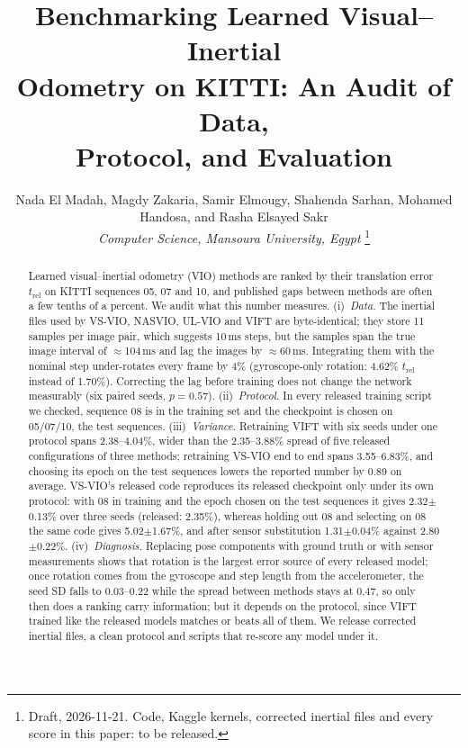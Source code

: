 \documentclass[letterpaper,journal]{IEEEtran}
\newcommand{\trel}{t_{\mathrm{rel}}}
\begin{document}
\title{Benchmarking Learned Visual--Inertial\\Odometry on KITTI: An Audit of Data,\\Protocol, and Evaluation}

\author{Nada El Madah, Magdy Zakaria, Samir Elmougy, Shahenda Sarhan, Mohamed Handosa, and Rasha Elsayed Sakr\\
\textit{Computer Science, Mansoura University, Egypt}%
\thanks{Draft, 2026-11-21. Code, Kaggle kernels, corrected inertial files and every score in this paper: to be released.}}


\maketitle

\begin{abstract}
Learned visual--inertial odometry (VIO) methods are ranked by their translation error $\trel$ on KITTI sequences 05, 07 and 10, and published gaps between methods are often a few tenths of a percent. We audit what this number measures. (i)~\emph{Data.} The inertial files used by VS-VIO, NASVIO, UL-VIO and VIFT are byte-identical; they store 11 samples per image pair, which suggests 10\,ms steps, but the samples span the true image interval of $\approx$104\,ms and lag the images by $\approx$60\,ms. Integrating them with the nominal step under-rotates every frame by 4\% (gyroscope-only rotation: 4.62\% $\trel$ instead of 1.70\%). Correcting the lag before training does not change the network measurably (six paired seeds, $p=0.57$). (ii)~\emph{Protocol.} In every released training script we checked, sequence 08 is in the training set and the checkpoint is chosen on 05/07/10, the test sequences. (iii)~\emph{Variance.} Retraining VIFT with six seeds under one protocol spans 2.38--4.04\%, wider than the 2.35--3.88\% spread of five released configurations of three methods; retraining VS-VIO end to end spans 3.55--6.83\%, and choosing its epoch on the test sequences lowers the reported number by 0.89 on average. VS-VIO's released code reproduces its released checkpoint only under its own protocol: with 08 in training and the epoch chosen on the test sequences it gives 2.32$\pm$0.13\% over three seeds (released: 2.35\%), whereas holding out 08 and selecting on 08 the same code gives 5.02$\pm$1.67\%, and after sensor substitution 1.31$\pm$0.04\% against 2.80$\pm$0.22\%. (iv)~\emph{Diagnosis.} Replacing pose components with ground truth or with sensor measurements shows that rotation is the largest error source of every released model; once rotation comes from the gyroscope and step length from the accelerometer, the seed SD falls to 0.03--0.22 while the spread between methods stays at 0.47, so only then does a ranking carry information; but it depends on the protocol, since VIFT trained like the released models matches or beats all of them. We release corrected inertial files, a clean protocol and scripts that re-score any model under it.
\end{abstract}
\end{document}
